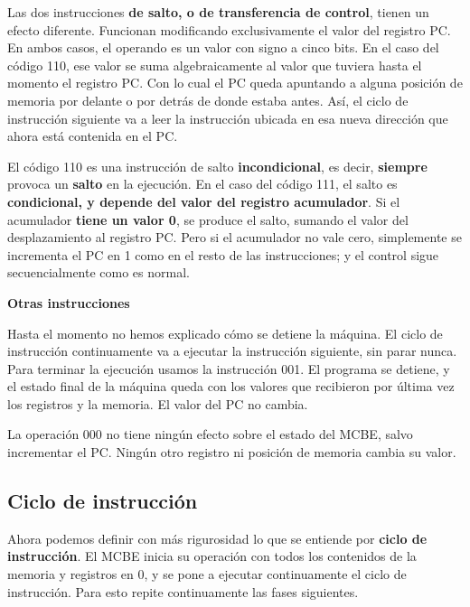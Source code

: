 \documentclass[spanish,a4paper,]{article}
\begin{document}
Las dos instrucciones \textbf{de salto, o de transferencia de control},
tienen un efecto diferente. Funcionan modificando exclusivamente el
valor del registro PC. En ambos casos, el operando es un valor con signo
a cinco bits. En el caso del código 110, ese valor se suma
algebraicamente al valor que tuviera hasta el momento el registro PC.
Con lo cual el PC queda apuntando a alguna posición de memoria por
delante o por detrás de donde estaba antes. Así, el ciclo de instrucción
siguiente va a leer la instrucción ubicada en esa nueva dirección que
ahora está contenida en el PC.

El código 110 es una instrucción de salto \textbf{incondicional}, es
decir, \textbf{siempre} provoca un \textbf{salto} en la ejecución. En el
caso del código 111, el salto es \textbf{condicional, y depende del
valor del registro acumulador}. Si el acumulador \textbf{tiene un valor
0}, se produce el salto, sumando el valor del desplazamiento al registro
PC. Pero si el acumulador no vale cero, simplemente se incrementa el PC
en 1 como en el resto de las instrucciones; y el control sigue
secuencialmente como es normal.

\textbf{Otras instrucciones}

Hasta el momento no hemos explicado cómo se detiene la máquina. El ciclo
de instrucción continuamente va a ejecutar la instrucción siguiente, sin
parar nunca. Para terminar la ejecución usamos la instrucción 001. El
programa se detiene, y el estado final de la máquina queda con los
valores que recibieron por última vez los registros y la memoria. El
valor del PC no cambia.

La operación 000 no tiene ningún efecto sobre el estado del MCBE, salvo
incrementar el PC. Ningún otro registro ni posición de memoria cambia su
valor.

\hypertarget{ciclo-de-instrucciuxf3n}{%
\subsection{Ciclo de instrucción}\label{ciclo-de-instrucciuxf3n}}

Ahora podemos definir con más rigurosidad lo que se entiende por
\textbf{ciclo de instrucción}. El MCBE inicia su operación con todos los
contenidos de la memoria y registros en 0, y se pone a ejecutar
continuamente el ciclo de instrucción. Para esto repite continuamente
las fases siguientes.
\end{document}
